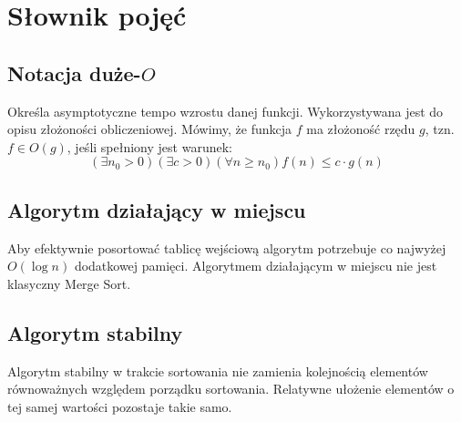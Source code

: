 \chapter{Słownik pojęć}

\section{Notacja duże-$O$}
Określa asymptotyczne tempo wzrostu danej funkcji. Wykorzystywana jest do opisu złożoności obliczeniowej.
Mówimy, że funkcja $f$ ma złożoność rzędu $g$, tzn. $f \in O(g)$, jeśli spełniony jest warunek:
$$(\exists n_0 > 0) (\exists c > 0) (\forall n \geq n_0) f(n) \leq c \cdot g(n)$$

\section{Algorytm działający w miejscu}
Aby efektywnie posortować tablicę wejściową algorytm potrzebuje co najwyżej $O(\log{n})$ dodatkowej pamięci. Algorytmem działającym w miejscu nie jest klasyczny Merge Sort.\\

\section{Algorytm stabilny}
Algorytm stabilny w trakcie sortowania nie zamienia kolejnością elementów równoważnych względem porządku sortowania. Relatywne ułożenie elementów o tej samej wartości pozostaje takie samo.\\